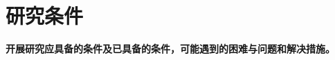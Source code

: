 



\section{研究条件}
\begin{mdframed}[everyline=true]

{\bfseries \kaishu {} 开展研究应具备的条件及已具备的条件，可能遇到的困难与问题和解决措施。}
\\[20 cm]
\end{mdframed}

